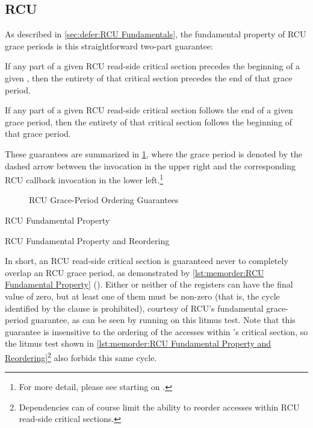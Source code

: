 \subsection{RCU}
\label{sec:memorder:RCU}

As described in
\cref{sec:defer:RCU Fundamentals},
the fundamental property of RCU grace periods is this straightforward
two-part guarantee:
\begin{enumerate*}[(1)]
\item If any part of a given RCU read-side critical section precedes
the beginning of a given , then the entirety of that
critical section precedes the end of that grace period.
\item If any part of a given RCU read-side critical section follows
the end of a given grace period, then the entirety of that
critical section follows the beginning of that grace period.
\end{enumerate*}
These guarantees are summarized in
\cref{fig:memorder:RCU Grace-Period Ordering Guarantees},
where the grace period is denoted by the dashed arrow between the
 invocation in the upper right and the corresponding
RCU callback invocation in the lower left.\footnote{
	For more detail, please see
	starting on
	.}

\begin{figure}
\centering
{}
\caption{RCU Grace-Period Ordering Guarantees}
\label{fig:memorder:RCU Grace-Period Ordering Guarantees}
\end{figure}

\begin{listing}

\caption{RCU Fundamental Property}
\label{lst:memorder:RCU Fundamental Property}
\end{listing}

\begin{listing}

\caption{RCU Fundamental Property and Reordering}
\label{lst:memorder:RCU Fundamental Property and Reordering}
\end{listing}

In short, an RCU read-side critical section is guaranteed never to
completely overlap an RCU grace period, as demonstrated by
\cref{lst:memorder:RCU Fundamental Property}
().
Either or neither of the  registers can have the final value of zero,
but at least one of them must be non-zero (that is, the cycle identified
by the  clause is prohibited), courtesy of RCU's fundamental
grace-period guarantee, as can be seen by running  on this litmus test.
Note that this guarantee is insensitive to the ordering of the accesses
within 's critical section, so the litmus test shown in
\cref{lst:memorder:RCU Fundamental Property and Reordering}\footnote{
	Dependencies can of course limit the ability to reorder accesses
	within RCU read-side critical sections.}
also forbids this same cycle.


